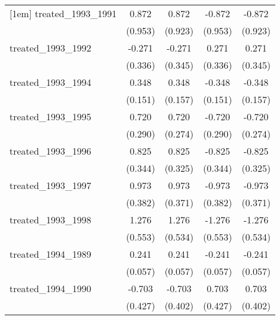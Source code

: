 {\begin{tabular}{l*{4}{c}}
[1em]
treated\_1993\_1991&       0.872         &       0.872         &      -0.872         &      -0.872         \\
            &     (0.953)         &     (0.923)         &     (0.953)         &     (0.923)         \\
[1em]
treated\_1993\_1992&      -0.271         &      -0.271         &       0.271         &       0.271         \\
            &     (0.336)         &     (0.345)         &     (0.336)         &     (0.345)         \\
[1em]
treated\_1993\_1994&       0.348\sym{*}  &       0.348\sym{*}  &      -0.348\sym{*}  &      -0.348\sym{*}  \\
            &     (0.151)         &     (0.157)         &     (0.151)         &     (0.157)         \\
[1em]
treated\_1993\_1995&       0.720\sym{*}  &       0.720\sym{**} &      -0.720\sym{*}  &      -0.720\sym{**} \\
            &     (0.290)         &     (0.274)         &     (0.290)         &     (0.274)         \\
[1em]
treated\_1993\_1996&       0.825\sym{*}  &       0.825\sym{*}  &      -0.825\sym{*}  &      -0.825\sym{*}  \\
            &     (0.344)         &     (0.325)         &     (0.344)         &     (0.325)         \\
[1em]
treated\_1993\_1997&       0.973\sym{*}  &       0.973\sym{**} &      -0.973\sym{*}  &      -0.973\sym{**} \\
            &     (0.382)         &     (0.371)         &     (0.382)         &     (0.371)         \\
[1em]
treated\_1993\_1998&       1.276\sym{*}  &       1.276\sym{*}  &      -1.276\sym{*}  &      -1.276\sym{*}  \\
            &     (0.553)         &     (0.534)         &     (0.553)         &     (0.534)         \\
[1em]
treated\_1994\_1989&       0.241\sym{***}&       0.241\sym{***}&      -0.241\sym{***}&      -0.241\sym{***}\\
            &     (0.057)         &     (0.057)         &     (0.057)         &     (0.057)         \\
[1em]
treated\_1994\_1990&      -0.703         &      -0.703         &       0.703         &       0.703         \\
            &     (0.427)         &     (0.402)         &     (0.427)         &     (0.402)         \\

\end{tabular}}
